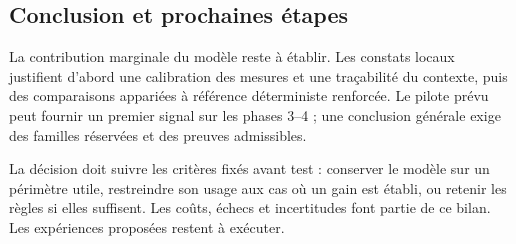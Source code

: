 \documentclass[11pt,a4paper]{article}
\begin{document}
\begin{samepage}
\section{Conclusion et prochaines étapes}
La contribution marginale du modèle reste à établir. Les constats locaux
justifient d'abord une calibration des mesures et une traçabilité du contexte,
puis des comparaisons appariées à référence déterministe renforcée. Le pilote
prévu peut fournir un premier signal sur les phases 3--4 ; une conclusion
générale exige des familles réservées et des preuves admissibles.

La décision doit suivre les critères fixés avant test : conserver le modèle
sur un périmètre utile, restreindre son usage aux cas où un gain est établi,
ou retenir les règles si elles suffisent. Les coûts, échecs et incertitudes
font partie de ce bilan. Les expériences proposées restent à exécuter.

\par\end{samepage}
\end{document}
